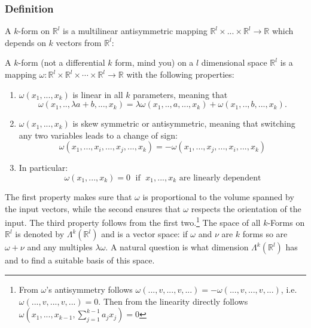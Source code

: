 \subsubsection{Definition}
A $k$-form on $\mathbb R^l$ is a multilinear antisymmetric mapping $\mathbb R^l \times ... \times \mathbb R^l \to \mathbb R$ which depends on $k$ vectors from $\mathbb R^l$: 
\begin{definition}[$k$-form]
 A $k$-form (not a differential $k$ form, mind you) on a $l$ dimensional space $\mathbb R^l$ is a mapping $\omega : \mathbb R^l \times \mathbb R^l\times \cdots \times  \mathbb R^l \rightarrow \mathbb R$ with the following properties:
\begin{enumerate}
\item $\omega(x_1,...,x_k)$ is linear in all $k$ parameters, meaning that \[\omega(x_1,..,\lambda a + b,..., x_k) = \lambda \omega(x_1,..,a,..., x_k) + \omega(x_1,.., b,..., x_k).\]
\item $\omega(x_1,...,x_k)$ is skew symmetric or antisymmetric, meaning that switching any two variables leads to a change of sign:
\[\omega(x_1,...,x_i,...,x_j,...,x_k) = - \omega(x_1,...,x_j,...,x_i,...,x_k)\]
\item In particular:
\[\omega(x_1,...,x_k) = 0 \;\text{ if }\;x_1,...,x_k \text{ are linearly dependent}\]
\end{enumerate}
\end{definition}

The first property makes sure that $\omega$ is proportional to the volume spanned by the input vectors, while the second ensures that $\omega$ respects the orientation of the input.
The third property follows from the first two.\footnote{From $\omega$'s antisymmetry follows $\omega(...,v,...,v,...) = -\omega(...,v,...,v,...)$, i.e. $\omega(...,v,...,v,...) = 0$. Then from the linearity directly follows  $\omega(x_1,...,x_{k-1}, \sum_{j=1}^{k-1} a_jx_j) = 0$} The space of all $k$-Forms on $\mathbb R^l$ is denoted by $\Lambda^k (\mathbb R^l)$ and is a vector space: if $\omega$ and $\nu$ are $k$ forms so are $\omega + \nu$ and any multiples $\lambda \omega$. A natural question is what dimension $\Lambda^k(\mathbb R^l)$ has and to find a suitable basis of this space.

